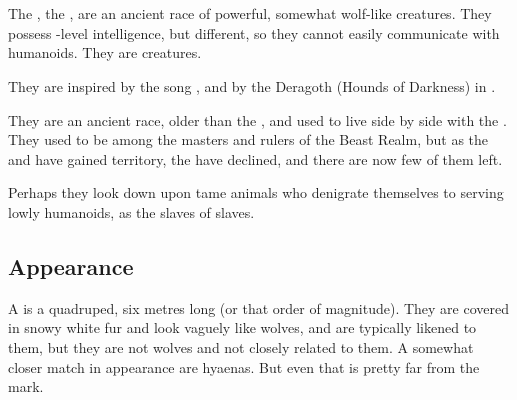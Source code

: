 















\section{\Vorcanth}
\index{\Vorcanth}
The \MoonWolves{}, the , are an ancient race of powerful, somewhat wolf-like creatures. They possess \human-level intelligence, but different, so they cannot easily communicate with humanoids. They are \Wylde{} creatures.

They are inspired by the song , and by the Deragoth (Hounds of Darkness) in \cite{StevenEriksonIanCameronEsslemont:MalazanBookoftheFallen}. 

They are an ancient race, older than the \nephilim, and used to live side by side with the \ophidians. They used to be among the masters and rulers of the Beast Realm, but as the \dragons{} and \resphain{} have gained territory, the \moonwolves{} have declined, and there are now few of them left.

Perhaps they look down upon tame animals who denigrate themselves to serving lowly humanoids, as the slaves of slaves.







\subsection{Appearance}
A \vorcanth{} is a quadruped, six metres long (or that order of magnitude). 
They are covered in snowy white fur and look vaguely like wolves, and are typically likened to them, but they are not wolves and not closely related to them. 
A somewhat closer match in appearance are hyaenas. 
But even that is pretty far from the mark.

